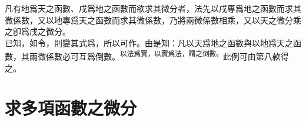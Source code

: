 \begin{enumerate} [label={第\chinese*款}]
	凡有地爲天之函數、戌爲地之函數而欲求其微分者，法先以戌專爲地之函數而求其微係數，又以地專爲天之函數而求其微係數，乃將兩微係數相乘，又以天之微分乘之卽爲戌之微分。\\
	已知\CJKmove，如令\CJKmove，則變其式爲\CJKmove，所以可作\CJKmove。由是知：凡以天爲地之函數與以地爲天之函數，其兩微係數必可互爲倒數。\textsuperscript{以法爲實，以實爲法，謂之倒數。}此例可由第八款得之。
\end{enumerate}

\section{求多項函數之微分}

